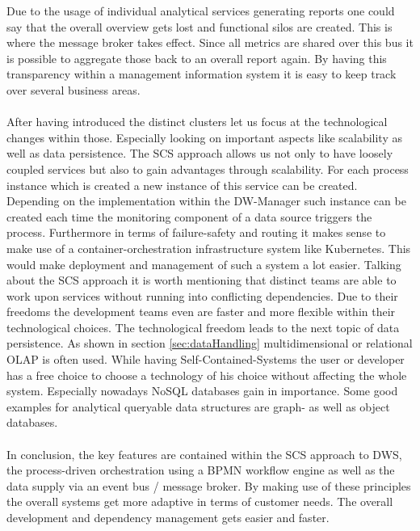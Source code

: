 Due to the usage of individual analytical services generating reports one could say that the overall overview gets lost and functional silos are created. This is where the message broker takes effect. Since all metrics are shared over this bus it is possible to aggregate those back to an overall report again. By having this transparency within a management information system it is easy to keep track over several business areas. \newline
\\
\\
After having introduced the distinct clusters let us focus at the technological changes within those. Especially looking on important aspects like scalability as well as data persistence.\newline
The SCS approach allows us not only to have loosely coupled services but also to gain advantages through scalability. For each process instance which is created a new instance of this service can be created. Depending on the implementation within the DW-Manager such instance can be created each time the monitoring component of a data source triggers the process. Furthermore in terms of failure-safety and routing it makes sense to make use of a container-orchestration infrastructure system like Kubernetes. This would make deployment and management of such a system a lot easier.\newline 
Talking about the SCS approach it is worth mentioning that distinct teams are able to work upon services without running into conflicting dependencies. Due to their freedoms the development teams even are faster and more flexible within their technological choices.\newline
The technological freedom leads to the next topic of data persistence. As shown in section \ref{sec:dataHandling} multidimensional or relational OLAP is often used. While having Self-Contained-Systems the user or developer has a free choice to choose a technology of his choice without affecting the whole system. Especially nowadays NoSQL databases gain in importance. Some good examples for analytical queryable data structures are graph- as well as object databases. 
\\
\\
In conclusion, the key features are contained within the SCS approach to DWS, the process-driven orchestration using a BPMN workflow engine as well as the data supply via an event bus / message broker. By making use of these principles the overall systems get more adaptive in terms of customer needs. The overall development and dependency management gets easier and faster. \newline

